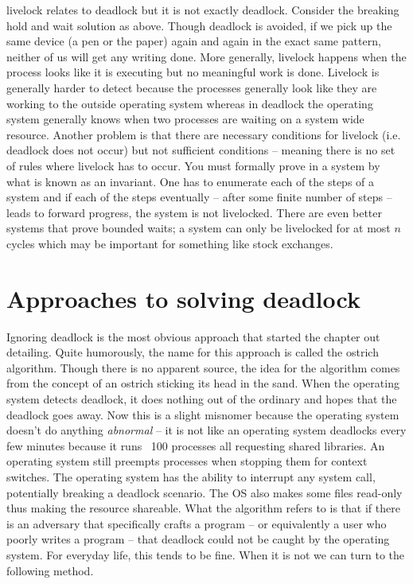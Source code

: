 \gls{livelock} relates to deadlock but it is not exactly deadlock.
Consider the breaking hold and wait solution as above.
Though deadlock is avoided, if we pick up the same device (a pen or the paper) again and again in the exact same pattern, neither of us will get any writing done.
More generally, livelock happens when the process looks like it is executing but no meaningful work is done.
Livelock is generally harder to detect because the processes generally look like they are working to the outside operating system whereas in deadlock the operating system generally knows when two processes are waiting on a system wide resource.
Another problem is that there are necessary conditions for livelock (i.e. deadlock does not occur) but not sufficient conditions -- meaning there is no set of rules where livelock has to occur.
You must formally prove in a system by what is known as an invariant.
One has to enumerate each of the steps of a system and if each of the steps eventually -- after some finite number of steps -- leads to forward progress, the system is not livelocked.
There are even better systems that prove bounded waits; a system can only be livelocked for at most $n$ cycles which may be important for something like stock exchanges.


\section{Approaches to solving deadlock}

Ignoring deadlock is the most obvious approach that started the chapter out detailing.
Quite humorously, the name for this approach is called the \gls{ostrich algorithm}.
Though there is no apparent source, the idea for the algorithm comes from the concept of an ostrich sticking its head in the sand.
When the operating system detects deadlock, it does nothing out of the ordinary and hopes that the deadlock goes away.
Now this is a slight misnomer because the operating system doesn't do anything \textit{abnormal} -- it is not like an operating system deadlocks every few minutes because it runs ~100 processes all requesting shared libraries.
An operating system still preempts processes when stopping them for context switches.
The operating system has the ability to interrupt any system call, potentially breaking a deadlock scenario.
The OS also makes some files read-only thus making the resource shareable.
What the algorithm refers to is that if there is an adversary that specifically crafts a program -- or equivalently a user who poorly writes a program -- that deadlock could not be caught by the operating system.
For everyday life, this tends to be fine.
When it is not we can turn to the following method.


